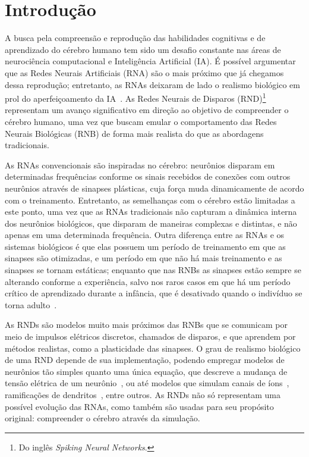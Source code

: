 \chapter{Introdução}

A busca pela compreensão e reprodução das habilidades cognitivas e de aprendizado do cérebro humano tem sido um desafio constante
nas áreas de neurociência computacional e Inteligência Artificial (IA). É possível argumentar que as Redes Neurais Artificiais
(RNA) são o mais próximo que já chegamos dessa reprodução; entretanto, as RNAs deixaram de lado o realismo biológico em prol do
aperfeiçoamento da IA~\cite{yamazakiSpiking2022}. As Redes Neurais de Disparos (RND)\footnote{Do inglês \textit{Spiking Neural
Networks}.} representam um avanço significativo em direção ao objetivo de compreender o cérebro humano, uma vez que buscam emular
o comportamento das Redes Neurais Biológicas (RNB) de forma mais realista do que as abordagens tradicionais.

As RNAs convencionais são inspiradas no cérebro: neurônios disparam em determinadas frequências conforme os sinais recebidos de
conexões com outros neurônios através de sinapses plásticas, cuja força muda dinamicamente de acordo com o treinamento.
Entretanto, as semelhanças com o cérebro estão limitadas a este ponto, uma vez que as RNAs tradicionais não capturam a dinâmica
interna dos neurônios biológicos, que disparam de maneiras complexas e distintas, e não apenas em uma determinada frequência.
Outra diferença entre as RNAs e os sistemas biológicos é que elas possuem um período de treinamento em que as sinapses são
otimizadas, e um período em que não há mais treinamento e as sinapses se tornam estáticas; enquanto que nas RNBs as sinapses estão
sempre se alterando conforme a experiência, salvo nos raros casos em que há um período crítico de aprendizado durante a infância,
que é desativado quando o indivíduo se torna adulto~\cite{crepelRegression1982}.

As RNDs são modelos muito mais próximos das RNBs que se comunicam por meio de impulsos elétricos discretos, chamados de disparos,
e que aprendem por métodos realistas, como a plasticidade das sinapses. O grau de realismo biológico de uma RND depende de sua
implementação, podendo empregar modelos de neurônios tão simples quanto uma única equação, que descreve a mudança de tensão
elétrica de um neurônio~\cite{burkittReview2006}, ou até modelos que simulam canais de íons~\cite{hodgkinQuantitative1952},
ramificações de dendritos~\cite{pagkalosIntroducing2023}, entre outros. As RNDs não só representam uma possível evolução das RNAs,
como também são usadas para seu propósito original: compreender o cérebro através da simulação.

